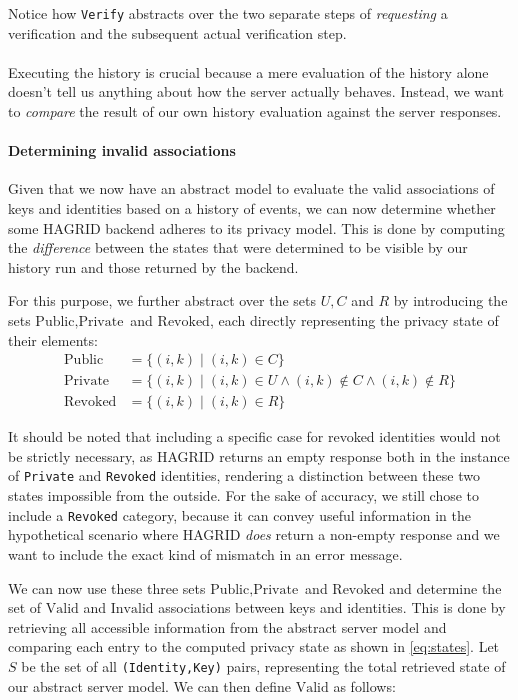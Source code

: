 Notice how \texttt{Verify} abstracts over the two separate steps of \emph{requesting} a verification and the subsequent actual verification step. \\ \\
Executing the history is crucial because a mere evaluation of the history alone doesn't tell us anything about how the server actually behaves. Instead, we want to \emph{compare} the result of our own history evaluation against the server responses.



\paragraph{Determining invalid associations}
\label{sec:priv_condition}
Given that we now have an abstract model to evaluate the valid associations of keys and identities based on a history of events, we can now determine whether some HAGRID backend adheres to its privacy model. This is done by computing the \emph{difference} between the states that were determined to be visible by our history run and those returned by the backend.

For this purpose, we further abstract over the sets \(U,C\) and \(R\) by introducing the sets \(\text{Public},\text{Private}\) and \(\text{Revoked}\),
each directly representing the privacy state of their elements: 
\begin{align}
    \text{Public}  &= \bigl \{ (i,k) \; \big|\; (i,k) \in C\bigr\}  \nonumber \\
    \text{Private} &= \bigl \{ (i,k) \; \big|\; (i,k) \in U \wedge (i,k) \notin C \wedge (i,k) \notin R\bigr\}  \\
    \text{Revoked} &= \bigl \{ (i,k) \; \big|\; (i,k) \in R\bigr\} \nonumber
\end{align}

It should be noted that including a specific case for revoked identities would not be strictly necessary, as HAGRID returns an empty response both in the instance of \texttt{Private} and \texttt{Revoked} identities, rendering a distinction between these two states impossible from the outside. For the sake of accuracy, we still chose to include a \texttt{Revoked} category, because it can convey useful information in the hypothetical scenario where HAGRID \emph{does} return a non-empty response and we want to include the exact kind of mismatch in an error message.

We can now use these three sets \(\text{Public},\text{Private}\) and \(\text{Revoked}\) and determine the set of \(\text{Valid}\) and \(\text{Invalid}\) associations between keys and identities. This is done by retrieving all accessible information from the abstract server model and comparing each entry to the computed privacy state as shown in \ref{eq:states}. Let \(S\) be the set of all \texttt{(Identity,Key)} pairs, representing the total retrieved state of our abstract server model. We can then define \(\text{Valid}\) as follows:  

